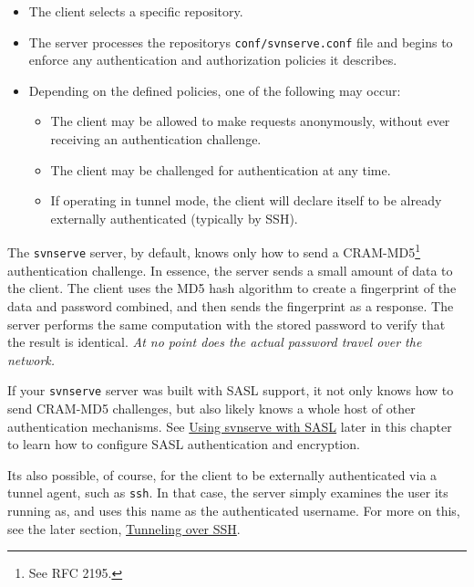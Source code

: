 \begin{itemize}
\item
  The client selects a specific repository.
\item
  The server processes the repository\textquotesingle s
  \texttt{conf/svnserve.conf} file and begins to enforce any
  authentication and authorization policies it describes.
\item
  Depending on the defined policies, one of the following may occur:

  \begin{itemize}
  \item
    The client may be allowed to make requests anonymously, without ever
    receiving an authentication challenge.
  \item
    The client may be challenged for authentication at any time.
  \item
    If operating in tunnel mode, the client will declare itself to be
    already externally authenticated (typically by SSH).
  \end{itemize}
\end{itemize}

The \texttt{svnserve} server, by default, knows only how to send a
CRAM-MD5\footnote{See RFC 2195.} authentication challenge. In essence,
the server sends a small amount of data to the client. The client uses
the MD5 hash algorithm to create a fingerprint of the data and password
combined, and then sends the fingerprint as a response. The server
performs the same computation with the stored password to verify that
the result is identical. \emph{At no point does the actual password
travel over the network.}

If your \texttt{svnserve} server was built with SASL support, it not
only knows how to send CRAM-MD5 challenges, but also likely knows a
whole host of other authentication mechanisms. See
\hyperref[svn.serverconfig.svnserve.sasl]{Using svnserve with SASL}
later in this chapter to learn how to configure SASL authentication and
encryption.

It\textquotesingle s also possible, of course, for the client to be
externally authenticated via a tunnel agent, such as \texttt{ssh}. In
that case, the server simply examines the user it\textquotesingle s
running as, and uses this name as the authenticated username. For more
on this, see the later section,
\hyperref[svn.serverconfig.svnserve.sshauth]{Tunneling over SSH}.

